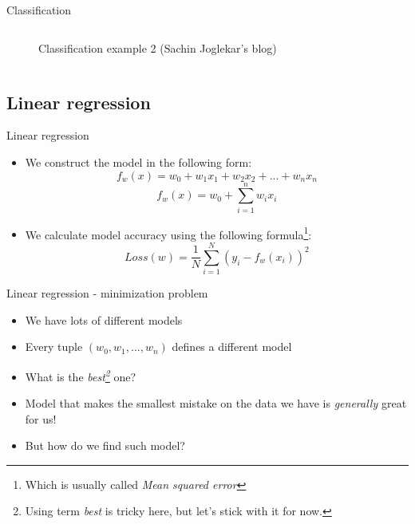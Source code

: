 \documentclass[aspectratio=169]{beamer}
\begin{document}
\begin{frame}{Classification}
\begin{columns}
\begin{column}{0.5\textwidth}
\begin{center}
\begin{figure}
                \caption{Classification example 2 (Sachin Joglekar's blog)}
            \end{figure}
        \end{center}
    \end{column}
    \end{columns}
\end{frame}
\subsection{Linear regression}
\begin{frame}{Linear regression}
    \begin{itemize}
        \item We construct the model in the following form:
        $$ f_w(x) = w_0 + w_1x_1 + w_2x_2 + ... + w_nx_n $$
        $$ f_w(x) = w_0 + \sum_{i=1}^{n} w_ix_i $$
    \item We calculate model accuracy using the following formula\footnote{Which is usually called \textit{Mean squared error}}:
        $$ Loss(w) = \frac{1}{N} \sum_{i=1}^{N} (y_i - f_w(x_i))^ 2 $$
    \end{itemize}
\end{frame}
\begin{frame}{Linear regression - minimization problem}
    \begin{itemize}
        \item We have lots of different models
        \item Every tuple $(w_0, w_1, ..., w_n)$ defines a different model
        \item What is the \textit{best\footnote{Using term \textit{best} is tricky here, but let's stick with it for now.}} one?
        \item Model that makes the smallest mistake on the data we have is \textit{generally} great for us!
        \item But how do we find such model?
    \end{itemize}
\end{frame}
\end{document}

